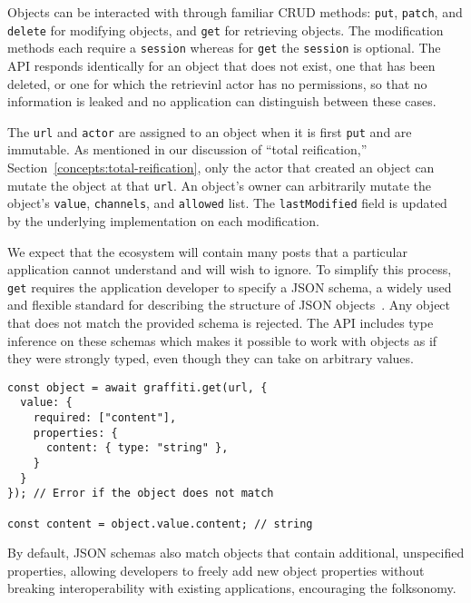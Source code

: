 Objects can be interacted with through familiar CRUD methods:
\texttt{put}, \texttt{patch}, and \texttt{delete} for modifying objects,
and \texttt{get} for retrieving objects.
The modification methods each require a \texttt{session} whereas
for \texttt{get} the \texttt{session} is optional.   The API responds identically for an object that does not exist, one that has been deleted, or one for which the retrievinl actor has no permissions, so that no information is leaked and no application can distinguish between these cases.

The \texttt{url} and \texttt{actor} are assigned to an object when it is first \texttt{put}
and are immutable.
As mentioned in our discussion of ``total reification,'' Section~\ref{concepts:total-reification},
only the actor that created an object can mutate the object at that \texttt{url}.
An object's owner can arbitrarily mutate the object's
\texttt{value}, \texttt{channels}, and \texttt{allowed} list.
The \texttt{lastModified} field is updated by the underlying implementation on each modification.

We expect that the ecosystem will contain many posts that a particular application cannot understand and will wish to ignore.  To simplify this process,
\texttt{get} requires the application developer to specify
a JSON schema, a widely used and flexible standard for describing
the structure of JSON objects~\cite{jsonschema}.
Any object that does not match the provided schema is rejected.
The API includes type inference on these schemas which makes it possible to work
with objects as if they were strongly typed, even though they can take on arbitrary values.


\begin{verbatim}
const object = await graffiti.get(url, {
  value: {
    required: ["content"],
    properties: {
      content: { type: "string" },
    }
  }
}); // Error if the object does not match

const content = object.value.content; // string
\end{verbatim}

By default, JSON schemas also match objects that contain additional,
unspecified properties, allowing developers to freely
add new object properties without breaking
interoperability with existing applications,
encouraging the folksonomy.


